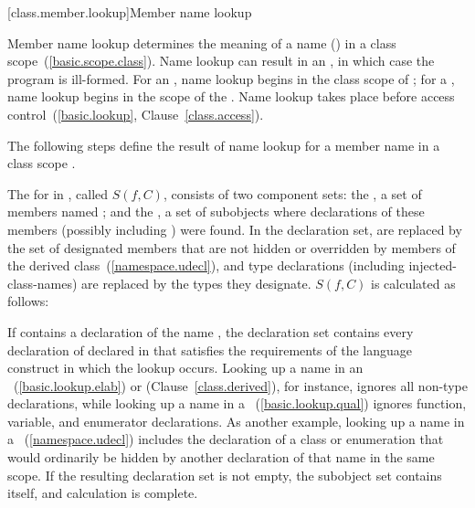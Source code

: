\exitexample

[class.member.lookup]{Member name lookup}%
%
%

\pnum
Member name lookup determines the meaning of a name
() in a class scope~(\ref{basic.scope.class}).
Name lookup can result in an , in which case the
program is ill-formed. For an , name lookup
begins in the class scope of ; for a
, name lookup begins in the scope of the
. Name lookup takes place before access
control~(\ref{basic.lookup}, Clause~\ref{class.access}).

\pnum
The following steps define the result of name lookup for a member name
 in a class scope .

\pnum
The  for  in , called $S(f,C)$,
consists of two component sets: the , a set of
members named ; and the , a set of
subobjects where declarations of these members (possibly including
) were found. In the declaration set,
 are replaced by the
set of designated members that are not hidden or overridden by members of the
derived class~(\ref{namespace.udecl}),
and type declarations (including injected-class-names) are
replaced by the types they designate. $S(f,C)$ is calculated as follows:

\pnum
If  contains a declaration of the name , the
declaration set contains every declaration of  declared in
 that satisfies the requirements of the language construct in
which the lookup occurs.
\enternote
Looking up a name in an
~(\ref{basic.lookup.elab}) or
 (Clause~\ref{class.derived}), for instance,
ignores all non-type declarations, while looking up a name in a
~(\ref{basic.lookup.qual}) ignores
function, variable, and enumerator declarations. As another example,
looking up a name in a
~(\ref{namespace.udecl}) includes the
declaration of a class or enumeration that would ordinarily be hidden by
another declaration of that name in the same scope.
\exitnote
If the resulting declaration set is not empty, the subobject set
contains  itself, and calculation is complete.

